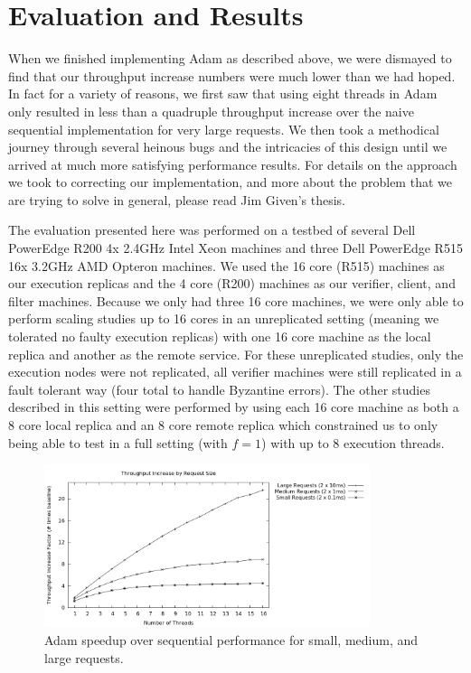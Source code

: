\documentclass[11pt, oneside]{report}
\begin{document}
\chapter{Evaluation and Results}\label{AdamResults}

When we finished implementing Adam as described above, we were dismayed to find that our throughput increase numbers were much lower than we had hoped. 
In fact for a variety of reasons, we first saw that using eight threads in Adam only resulted in less than a quadruple throughput increase over the naive sequential implementation for very large requests. 
We then took a methodical journey through several heinous bugs and the intricacies of this design until we arrived at much more satisfying performance results. 
For details on the approach we took to correcting our implementation, and more about the problem that we are trying to solve in general, please read Jim Given's thesis.

The evaluation presented here was performed on a testbed of several Dell PowerEdge R200 4x 2.4GHz Intel Xeon machines and three Dell PowerEdge R515 16x 3.2GHz AMD Opteron machines. 
We used the 16 core (R515) machines as our execution replicas and the 4 core (R200) machines as our verifier, client, and filter machines. 
Because we only had three 16 core machines, we were only able to perform scaling studies up to 16 cores in an unreplicated setting (meaning we tolerated no faulty execution replicas) with one 16 core machine as the local replica and another as the remote service. 
For these unreplicated studies, only the execution nodes were not replicated, all verifier machines were still replicated in a fault tolerant way (four total to handle Byzantine errors).
The other studies described in this setting were performed by using each 16 core machine as both a 8 core local replica and an 8 core remote replica which constrained us to only being able to test in a full setting (with $f = 1$) with up to 8 execution threads.

\begin{figure}[h]
\centering
\includegraphics[width=0.85\textwidth]{graphs/requestweights/graph.png}
\caption{\label{scaling}Adam speedup over sequential performance for small, medium, and large requests.}
\end{figure}
\end{document}
